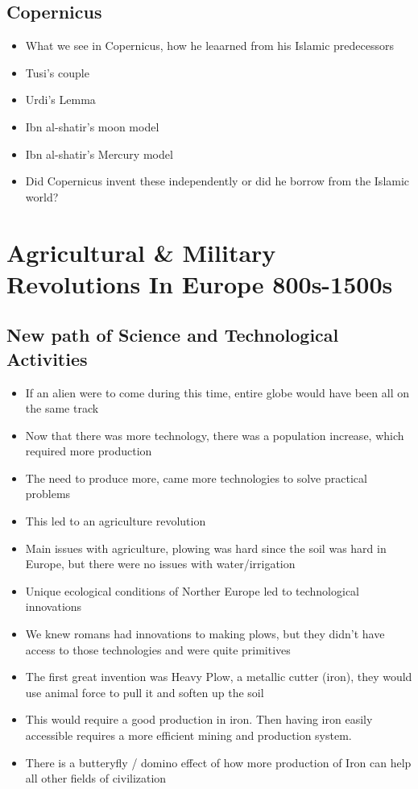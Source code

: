 \documentclass{article}
\begin{document}
\subsection{Copernicus}
\begin{itemize}
  \item What we see in Copernicus,
    how he leaarned from his Islamic predecessors
  \item Tusi's couple
  \item Urdi's Lemma
  \item Ibn al-shatir's moon model
  \item Ibn al-shatir's Mercury model
  \item Did Copernicus invent these independently or did he borrow from
    the Islamic world?
\end{itemize}

\newpage

\section{Agricultural \& Military Revolutions In Europe 800s-1500s}
\subsection{New path of Science and Technological Activities}
\begin{itemize}
  \item If an alien were to come during this time, entire globe would have been
    all on the same track
  \item Now that there was more technology, there was a population increase,
    which required more production
  \item The need to produce more, came more technologies to solve practical problems
  \item This led to an agriculture revolution
  \item Main issues with agriculture, plowing was hard since the soil was hard in Europe,
    but there were no issues with water/irrigation
  \item Unique ecological conditions of Norther Europe led to technological innovations
  \item We knew romans had innovations to making plows, but they
    didn't have access to those technologies and were quite
    primitives
  \item The first great invention was Heavy Plow, a metallic cutter (iron),
    they would use animal force to pull it and soften up the soil
  \item This would require a good production in iron. Then having iron easily accessible requires
    a more efficient mining and production system.
  \item There is a butteryfly / domino effect of how more production of Iron can help all other fields
    of civilization

\end{itemize}
\end{document}
